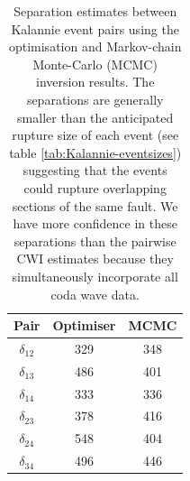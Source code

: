 \documentclass[grl]{agutex}
\begin{document}
\begin{table}
\caption{Separation estimates between Kalannie event pairs using
the optimisation and Markov-chain Monte-Carlo (MCMC) inversion
results. The separations are generally smaller
than the anticipated rupture size of each event (see table \ref{tab:Kalannie-eventsizes}) suggesting that
the events could rupture overlapping sections of the same fault. We have
more confidence in these separations than the pairwise CWI estimates because they
simultaneously incorporate all coda wave data.}
\label{tab:-KalannieRes-separations}
\begin{tabular}{c|cc}
\hline
Pair & Optimiser & MCMC \\
\hline
$\delta_{12}$ & 329 & 348 \\
$\delta_{13}$ & 486 & 401 \\
$\delta_{14}$ & 333 & 336 \\
$\delta_{23}$ & 378 & 416 \\
$\delta_{24}$ & 548 & 404 \\
$\delta_{34}$ & 496 & 446 \\
\hline
\end{tabular}
\end{table}
\end{document}
